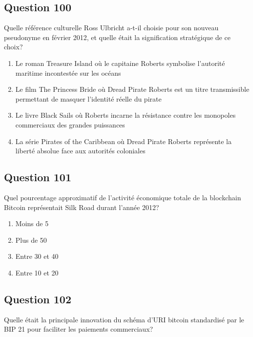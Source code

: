 \documentclass[12pt,a4paper]{article}
\begin{document}
\subsection*{Question 100}
Quelle référence culturelle Ross Ulbricht a-t-il choisie pour son nouveau pseudonyme en février 2012, et quelle était la signification stratégique de ce choix?

\begin{enumerate}[label=\Alph*., leftmargin=*]
\item Le roman Treasure Island où le capitaine Roberts symbolise l'autorité maritime incontestée sur les océans
\item Le film The Princess Bride où Dread Pirate Roberts est un titre transmissible permettant de masquer l'identité réelle du pirate
\item Le livre Black Sails où Roberts incarne la résistance contre les monopoles commerciaux des grandes puissances
\item La série Pirates of the Caribbean où Dread Pirate Roberts représente la liberté absolue face aux autorités coloniales
\end{enumerate}

\bigskip


\subsection*{Question 101}
Quel pourcentage approximatif de l'activité économique totale de la blockchain Bitcoin représentait Silk Road durant l'année 2012?

\begin{enumerate}[label=\Alph*., leftmargin=*]
\item Moins de 5 %
\item Plus de 50 %
\item Entre 30 et 40 %
\item Entre 10 et 20 %
\end{enumerate}

\bigskip


\subsection*{Question 102}
Quelle était la principale innovation du schéma d'URI bitcoin standardisé par le BIP 21 pour faciliter les paiements commerciaux?
\end{document}
